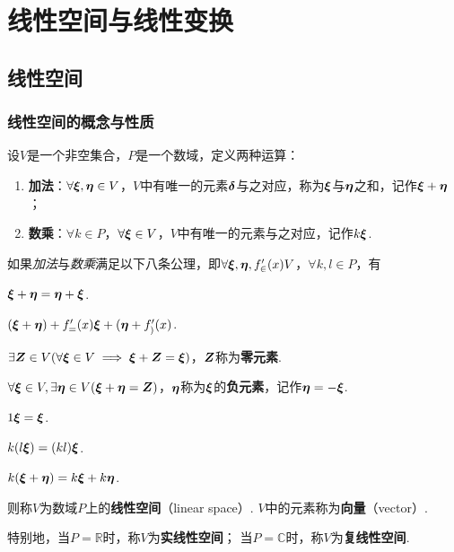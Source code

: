 \chapter{线性空间与线性变换}
\section{线性空间}
\subsection{线性空间的概念与性质}
\begin{definition}
设\(V\)是一个非空集合，\(P\)是一个数域，定义两种运算：
\begin{enumerate}
\item {\bf 加法}：\(\forall \boldsymbol{\xi},\boldsymbol{\eta} \in V\)，\(V\)中有唯一的元素\(\boldsymbol{\delta}\)与之对应，称为\(\boldsymbol{\xi}\)与\(\boldsymbol{\eta}\)之和，记作\(\boldsymbol{\xi}+\boldsymbol{\eta}\)；
\item {\bf 数乘}：\(\forall k \in P\)，\(\forall \boldsymbol{\xi} \in V\)，\(V\)中有唯一的元素与之对应，记作\(k\boldsymbol{\xi}\).
\end{enumerate}

如果\emph{加法}与\emph{数乘}满足以下八条公理，即\(\forall \boldsymbol{\xi},\boldsymbol{\eta},f_{\in}'(x) V\)，\(\forall k,l \in P\)，有

\begin{center}
\begin{minipage}{.8\textwidth}
\begin{axiom}
\(\boldsymbol{\xi}+\boldsymbol{\eta}=\boldsymbol{\eta}+\boldsymbol{\xi}\).
\end{axiom}
\begin{axiom}
\((\boldsymbol{\xi}+\boldsymbol{\eta})+f_{=}'(x)\boldsymbol{\xi}+(\boldsymbol{\eta}+f_{)}'(x)\).
\end{axiom}
\begin{axiom}
\(\exists \boldsymbol{Z} \in V (\forall\boldsymbol{\xi} \in V \implies \boldsymbol{\xi}+\boldsymbol{Z}=\boldsymbol{\xi})\)，\(\boldsymbol{Z}\)称为\textbf{零元素}.
\end{axiom}
\begin{axiom}
\(\forall\boldsymbol{\xi} \in V, \exists \boldsymbol{\eta} \in V (\boldsymbol{\xi}+\boldsymbol{\eta}=\boldsymbol{Z})\)，\(\boldsymbol{\eta}\)称为\(\boldsymbol{\xi}\)的\textbf{负元素}，记作\(\boldsymbol{\eta} = -\boldsymbol{\xi}\).
\end{axiom}
\begin{axiom}
\(1\boldsymbol{\xi}=\boldsymbol{\xi}\).
\end{axiom}
\begin{axiom}
\(k(l\boldsymbol{\xi})=(kl)\boldsymbol{\xi}\).
\end{axiom}
\begin{axiom}
\(k(\boldsymbol{\xi}+\boldsymbol{\eta})=k\boldsymbol{\xi}+k\boldsymbol{\eta}\).
\end{axiom}
\end{minipage}
\end{center}

则称\(V\)为数域\(P\)上的\textbf{线性空间}（linear space）.
\(V\)中的元素称为\textbf{向量}（vector）\nolinebreak.

特别地，当\(P = \mathbb{R}\)时，称\(V\)为\textbf{实线性空间}；
当\(P = \mathbb{C}\)时，称\(V\)为\textbf{复线性空间}.
\end{definition}

